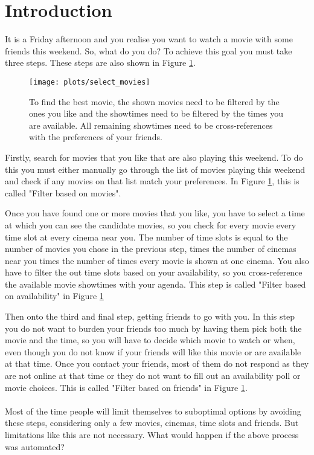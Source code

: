 \documentclass{article}
\begin{document}
 \section{Introduction} \label{intro}
 It is a Friday afternoon and you realise you want to watch a movie with some friends this weekend. So, what do you do? To achieve this goal you must take three steps. These steps are also shown in Figure \ref{movies}.
  
 \begin{figure}[H]
 \centering
 \texttt{[image: plots/select\_movies]}
 \caption[Movie selection process]{To find the best movie, the shown movies need to be filtered by the ones you like and the showtimes need to be filtered by the times you are available. All remaining showtimes need to be cross-references with the preferences of your friends.}
 \label{movies}
 \end{figure}
 
 Firstly, search for movies that you like that are also playing this weekend. To do this you must either manually go through the list of movies playing this weekend and check if any movies on that list match your preferences. In Figure \ref{movies}, this is called "Filter based on movies".
 
 Once you have found one or more movies that you like, you have to select a time at which you can see the candidate movies, so you check for every movie every time slot at every cinema near you. The number of time slots is equal to the number of movies you chose in the previous step, times the number of cinemas near you times the number of times every movie is shown at one cinema. You also have to filter the out time slots based on your availability, so you cross-reference the available movie showtimes with your agenda. This step is called "Filter based on availability" in Figure \ref{movies}
 
 Then onto the third and final step, getting friends to go with you. In this step you do not want to burden your friends too much by having them pick both the movie and the time, so you will have to decide which movie to watch or when, even though you do not know if your friends will like this movie or are available at that time. Once you contact your friends, most of them do not respond as they are not online at that time or they do not want to fill out an availability poll or movie choices. This is called "Filter based on friends" in Figure \ref{movies}.
 \paragraph{}
 Most of the time people will limit themselves to suboptimal options by avoiding these steps, considering only a few movies, cinemas, time slots and friends. But limitations like this are not necessary. What would happen if the above process was automated?
 
\end{document}
